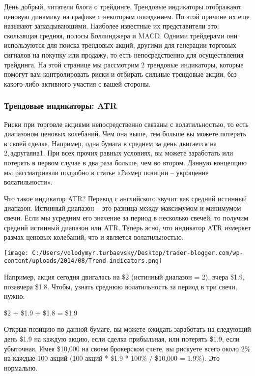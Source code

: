 \documentclass[a5paper]{article}
\begin{document}
День добрый, читатели блога о трейдинге. Трендовые индикаторы отображают ценовую динамику на графике с некоторым опозданием. По этой причине их еще называют запаздывающими. Наиболее известные их представители это: скользящая средняя, полосы Боллинджера и MACD. Одними трейдерами они используются для поиска трендовых акций, другими для генерации торговых сигналов на покупку или продажу, то есть непосредственно для осуществления трейдинга. На этой странице мы рассмотрим 2 трендовые индикаторы, которые помогут вам контролировать риски и отбирать сильные трендовые акции, без какого-либо активного участия с вашей стороны.

\subsubsection{Трендовые индикаторы: ATR}

Риски при торговле акциями непосредственно связаны с волатильностью, то есть диапазоном ценовых колебаний. Чем она выше, тем больше вы можете потерять в своей сделке. Например, одна бумага в среднем за день двигается на $2, а другая на $1. При всех прочих равных условиях, вы можете заработать или потерять в первом случае в два раза больше, чем во втором. Данную концепцию мы рассматривали подробно в статье «Размер позиции – укрощение волатильности».

Что такое индикатор ATR? Перевод с английского звучит как средний
истинный диапазон. Истинный диапазон – это разница между максимумом и
минимумом свечи. Если мы усредним его значение за период в несколько
свечей, то получим средний истинный диапазон или ATR. Теперь ясно, что
индикатор ATR измеряет размах ценовых колебаний, что и является
волатильностью.

\texttt{[image: C:/Users/volodymyr.turbaevsky/Desktop/trader-blogger.com/wp-content/uploads/2014/08/Trend-indicators.png]}

Например, акция сегодня двигалась на \$2 (истинный диапазон = 2), вчера \$1.9, позавчера \$1.8. Чтобы, узнать среднюю волатильность за период в три свечи, нужно:

\$2 + \$1.9 + \$1.8 = \$1.9

Открыв позицию по данной бумаге, вы можете ожидать заработать на следующий день \$1.9 на каждую акцию, если сделка прибыльная, или потерять \$1.9, если убыточная. Имея \$10,000 на своем брокерском счете, вы рискуете всего около 2\% на каждые 100 акций (100 акций * \$1.9 * 100\% / \$10,000 = 1.9\%). Это нормально.
\end{document}
